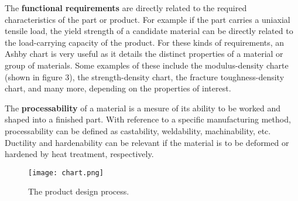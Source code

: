\documentclass[letterpaper]{article}
\begin{document}
\begin{multicols}{2}
	The \textbf{functional requirements} are directly related to the required characteristics of the part or product. For example if the part carries a uniaxial tensile load, the yield strength of a candidate material can be directly related to the load-carrying capacity of the product. For these kinds of requirements, an Ashby chart is very useful as it details the distinct properties of a material or group of materials. Some examples of these include the modulus-density charte (shown in figure 3), the strength-density chart, the fracture toughness-density chart, and many more, depending on the properties of interest.\supercite{ashby92}

	The \textbf{processability} of a material is a mesure of its ability to be worked and shaped into a finished part. With reference to a specific manufacturing method, processability can be defined as castability, weldability, machinability, etc. Ductility and hardenability can be relevant if the material is to be deformed or hardened by heat treatment, respectively.
\end{multicols}
\begin{figure}[H]
	\centering
	\texttt{[image: chart.png]}
	\caption{The product design process.}
\end{figure}
\end{document}
